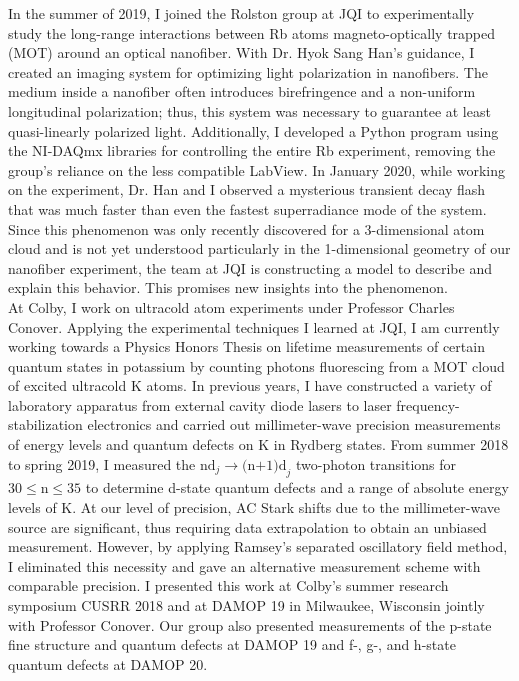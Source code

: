 \documentclass[12pt]{article}
\begin{document}
In the summer of 2019, I joined the Rolston group at JQI to experimentally study the long-range interactions between Rb atoms magneto-optically trapped (MOT) around an optical nanofiber. With Dr. Hyok Sang Han's guidance, I created an imaging system for optimizing light polarization in nanofibers. The medium inside a nanofiber often introduces birefringence and a non-uniform longitudinal polarization; thus, this system was necessary to guarantee at least  quasi-linearly polarized light. Additionally, I developed a Python program using the NI-DAQmx libraries for controlling the entire Rb experiment, removing the group's reliance on the less compatible LabView. In January 2020, while working on the experiment, Dr. Han and I observed a mysterious transient decay flash that was much faster than even the fastest superradiance mode of the system. Since this phenomenon was only recently discovered for a 3-dimensional atom cloud and is not yet understood particularly in the 1-dimensional geometry of our nanofiber experiment, the team at JQI is constructing a model to describe and explain this behavior. This promises new insights into the phenomenon.  \\ 

At Colby, I work on ultracold atom experiments under Professor Charles Conover. Applying the experimental techniques I learned at JQI, I am currently working towards a Physics Honors Thesis on lifetime measurements of certain quantum states in potassium by counting photons fluorescing from a MOT cloud of excited ultracold K atoms. In previous years, I have constructed a variety of laboratory apparatus from external cavity diode lasers to laser frequency-stabilization electronics and carried out millimeter-wave precision measurements of energy levels and quantum defects on K in Rydberg states. From summer 2018 to spring 2019, I measured the $\mbox{nd}_{j} \to \mbox{(n+1)d}_{j}$ two-photon transitions for $\mbox{30} \leq \mbox{n} \leq \mbox{35}$ to determine d-state quantum defects and a range of absolute energy levels of K. At our level of precision, AC Stark shifts due to the millimeter-wave source are significant, thus requiring data extrapolation to obtain an unbiased measurement. However, by applying Ramsey's separated oscillatory field method, I eliminated this necessity and gave an alternative measurement scheme with comparable precision. I presented this work at Colby's summer research symposium CUSRR 2018 and at DAMOP 19 in Milwaukee, Wisconsin jointly with Professor Conover. Our group also presented measurements of the p-state fine structure and quantum defects at DAMOP 19 and f-, g-, and h-state quantum defects at DAMOP 20. \\ 
\end{document}
